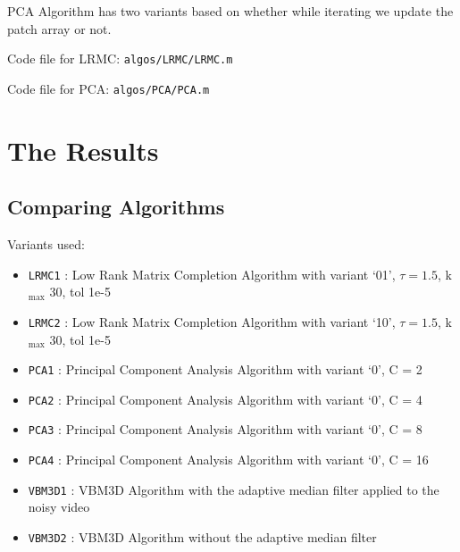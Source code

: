 \documentclass[fleqn, 11pt]{article}
\begin{document}
PCA Algorithm has two variants based on whether while iterating we update the patch array or not.

\bigskip

Code file for LRMC: \texttt{algos/LRMC/LRMC.m}

Code file for PCA: \texttt{algos/PCA/PCA.m}


\newpage 

\section*{The Results}

\subsection*{Comparing Algorithms}

Variants used:
\begin{itemize}[noitemsep]
    \item \texttt{LRMC1} : Low Rank Matrix Completion Algorithm with variant `01', $\tau = 1.5$, k$_\text{max}$ 30, tol 1e-5
    \item \texttt{LRMC2} : Low Rank Matrix Completion Algorithm with variant `10', $\tau = 1.5$, k$_\text{max}$ 30, tol 1e-5
    \item \texttt{PCA1} : Principal Component Analysis Algorithm with variant `0', C = 2
    \item \texttt{PCA2} : Principal Component Analysis Algorithm with variant `0', C = 4
    \item \texttt{PCA3} : Principal Component Analysis Algorithm with variant `0', C = 8
    \item \texttt{PCA4} : Principal Component Analysis Algorithm with variant `0', C = 16
    \item \texttt{VBM3D1} : VBM3D Algorithm with the adaptive median filter applied to the noisy video
    \item \texttt{VBM3D2} : VBM3D Algorithm without the adaptive median filter
\end{itemize}
\end{document}
